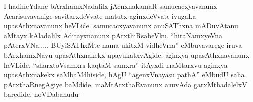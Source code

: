 \begin{artha}
I hadineYdane bArxhamxNadalilx jAcnxnakamaR samucacxyavanunx Acarisuvavanige savitarxdeVvate matutx aginxdeVvate ivugaLa upasAthxnavanunx heVLide. samucacxyavanunx anuSAThxna mADuvAtanu aMtayx kAladalilx Aditayxnanunx pArxthiRsabeVku. ``hiraNamxyeVna pAterxVNa..... BUyiSAThxMte nama ukitxM vidheVma'' eMbuvavarege iruva bArxhamxNavu upasAthxnakekx upayukatxvAgide. aginxya upasAthxnavanunx heVLide. ``sharxtoVsamxra kaqtaM samxra'' itAyxdi maMtarxvu aginxya upasAthxnakekx saMbaMdhiside, hAgU ``agenxVnayasu pathA'' eMbudU saha pArxthaRnegAgiye baMdide. maMtArxthaRvanunx anuvAda garxMthadalelxV baredide, noVDabahudu{\rm --}
\end{artha}

\centerline{}
